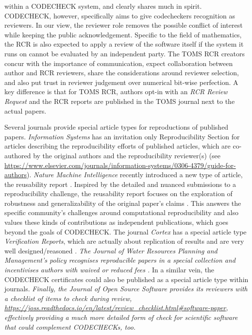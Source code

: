 \documentclass[12pt]{article}
\newcommand{\rev}[1]{\textit{#1}}
\begin{document}
within a CODECHECK system, and clearly shares much in spirit.
CODECHECK, however, specifically aims to give codecheckers recognition
as reviewers.  In our view, the reviewer role removes the possible
conflict of interest while keeping the public acknowledgement.
Specific to the field of mathematics, the RCR is also expected to
apply a review of the software itself if the system it runs on cannot
be evaluated by an independent party.  The TOMS RCR creators concur
with the importance of communication, expect collaboration between
author and RCR reviewers, share the considerations around reviewer
selection, and also put trust in reviewer judgement over numerical
bit-wise perfection.  A key difference is that for TOMS RCR, authors
opt-in with an \emph{RCR Review Request} and the RCR reports are
published in the TOMS journal next to the actual papers.


Several journals provide special article types for reproductions of
published papers.  \emph{Information Systems} has an invitation only
Reproducibility Section for articles describing the reproducibility 
efforts of published articles, which are co-authored by the original
authors and the reproducibility reviewer(s) (see
\url{https://www.elsevier.com/journals/information-systems/0306-4379/guide-for-authors}).
\emph{Nature Machine Intelligence} recently introduced a new type of
article, the reusability report \cite{noauthor_research_2020}.
Inspired by the detailed and nuanced submissions to a reproducibility
challenge, the reusability report focuses on the exploration of
robustness and generalizability of the original paper's claims
\cite{noauthor_research_2020}. This answers the specific community's
challenges around computational reproducibility and also values these
kinds of contributions as independent publications, which goes beyond
the goals of CODECHECK.  The journal \emph{Cortex} has a special
article type \emph{Verification Reports}, which are actually about
replication of results and are very well designed/reasoned
\cite{chambers_verification_2020}.
\rev{The \emph{Journal of Water Resources Planning and Management}'s 
policy recognises reproducible papers in a special collection and 
incentivises authors with waived or reduced fees
\cite{rosenberg_reproducible_2021}.}
In a similar vein, the CODECHECK
certificates could also be published as a special article type within
journals.  \rev{Finally, the \textit{Journal of Open Source Software}
provides its reviewers with a checklist of items to check during
review,
\url{https://joss.readthedocs.io/en/latest/review_checklist.html#software-paper},
effectively providing a much more detailed form of check for scientific
software that could complement CODECHECKs, too.}
\end{document}
